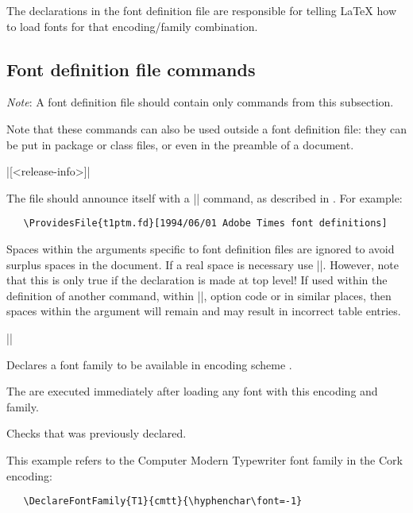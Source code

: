 \documentclass{ltxguide}[1995/11/28]
\begin{document}
The declarations in the font definition file are responsible for
telling \LaTeX{} how to load fonts for that encoding/family
combination.  
 
\subsection{Font definition file commands}
 
\emph{Note}: A font definition file should contain only commands
from this subsection.

Note that these commands can also be used outside a font definition
file: they can be put in package or class files, or even in the
preamble of a document.
 
\begin{decl}
   |[<release-info>]|
\end{decl}
The file should announce itself with a |\ProvidesFile| command,
as described in \emph{\clsguide}.  For example:
\begin{verbatim}
   \ProvidesFile{t1ptm.fd}[1994/06/01 Adobe Times font definitions]
\end{verbatim}
 
Spaces within the arguments specific to font definition files are
ignored to avoid surplus spaces in the document. If a real space is
necessary use |\space|.  
However, note that this is only true if the
declaration is made at top level! If used within the definition of
another command, within |\AtBeginDocument|, option code or in similar
places, then spaces within the argument will remain and may result in
incorrect table entries.

\begin{decl}
|\DeclareFontFamily|   
\end{decl}
 
Declares a font family  to be available in encoding scheme
.
 
The  are executed immediately after loading any
font with this encoding and family.
 
Checks that  was previously declared.
 
This example refers to the Computer Modern Typewriter font family in
the Cork encoding:
\begin{verbatim}
   \DeclareFontFamily{T1}{cmtt}{\hyphenchar\font=-1}
\end{verbatim}
 
\end{document}
